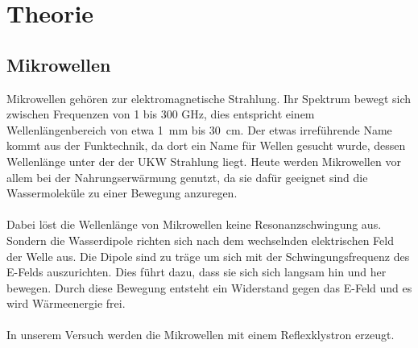 \section{Theorie}
\label{sec:Theorie}

\subsection{Mikrowellen}
Mikrowellen gehören zur elektromagnetische Strahlung.
Ihr Spektrum bewegt sich zwischen Frequenzen von 1 bis 300 \si{\giga\Hz}, dies entspricht einem Wellenlängenbereich von etwa \SI{1}{\milli\meter} bis \SI{30}{\centi\meter}.
Der etwas irreführende Name kommt aus der Funktechnik, da dort ein Name für Wellen gesucht wurde, dessen Wellenlänge unter der der UKW Strahlung liegt.
Heute werden Mikrowellen vor allem bei der Nahrungserwärmung genutzt, da sie dafür geeignet sind die Wassermoleküle zu einer Bewegung anzuregen.
\\\\
Dabei löst die Wellenlänge von Mikrowellen keine Resonanzschwingung aus. 
Sondern die Wasserdipole richten sich nach dem wechselnden elektrischen Feld der Welle aus.
Die Dipole sind zu träge um sich mit der Schwingungsfrequenz des E-Felds auszurichten. 
Dies führt dazu, dass sie sich sich langsam hin und her bewegen.
Durch diese Bewegung entsteht ein Widerstand gegen das E-Feld und es wird Wärmeenergie frei.
\\\\
In unserem Versuch werden die Mikrowellen mit einem Reflexklystron erzeugt.

